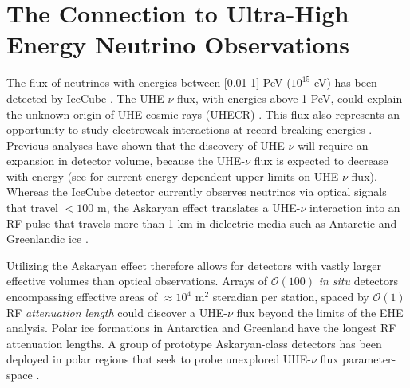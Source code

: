 \documentclass[11pt]{amsart}
\begin{document}
\section{The Connection to Ultra-High Energy Neutrino Observations}
\label{sec:askaryan}

The flux of neutrinos with energies between [0.01-1] PeV ($10^{15}$ eV) has been detected by IceCube \cite{10.1126/science.1242856}.  The UHE-$\nu$ flux, with energies above 1 PeV, could explain the unknown origin of UHE cosmic rays (UHECR) \cite{Ackermann:201946d}.  This flux also represents an opportunity to study electroweak interactions at record-breaking energies \cite{Ackermann:20195ec}.  Previous analyses have shown that the discovery of UHE-$\nu$ will require an expansion in detector volume, because the UHE-$\nu$ flux is expected to decrease with energy (see \cite{10.1103/physrevd.99.122001,10.1088/1475-7516/2020/03/053,10.1103/physrevd.98.062003} for current energy-dependent upper limits on UHE-$\nu$ flux).  Whereas the IceCube detector currently observes neutrinos via optical signals that travel $<100$ m, the Askaryan effect translates a UHE-$\nu$ interaction into an RF pulse that travels more than 1 km in dielectric media such as Antarctic and Greenlandic ice \cite{askaryan1,zhs,10.3189/2015jog14j214, 10.3189/2015jog15j057, 10.1016/j.astropartphys.2011.11.010}. 

Utilizing the Askaryan effect therefore allows for detectors with vastly larger effective volumes than optical observations.  Arrays of $\mathcal{O}(100)$ \textit{in situ} detectors encompassing effective areas of $\approx 10^4$ m$^2$ steradian per station, spaced by $\mathcal{O}(1)$ RF \textit{attenuation length} could discover a UHE-$\nu$ flux beyond the limits of the EHE analysis.  Polar ice formations in Antarctica and Greenland have the longest RF attenuation lengths.  A group of prototype Askaryan-class detectors has been deployed in polar regions that seek to probe unexplored UHE-$\nu$ flux parameter-space \cite{rice,10.1088/1475-7516/2020/03/053,10.1103/physrevd.102.043021,10.1103/physrevd.99.122001}. 
\end{document}
